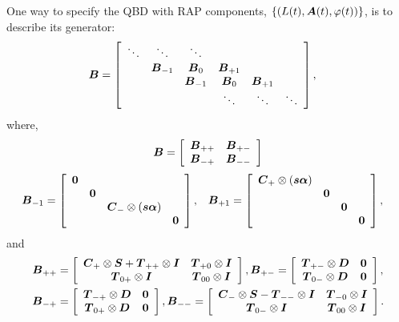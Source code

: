 One way to specify the QBD with RAP components, \(\left\{(L(t),\boldsymbol A(t),{\varphi}(t))\right\}\), is to describe its generator:
\begin{align*}
\boldsymbol{B} &= \left[\begin{array}{cccccc}
 \ddots & \ddots & \ddots & & & \\
 & \boldsymbol{B}_{-1} & \boldsymbol{B}_0 & \boldsymbol{B}_{+1} & & \\ 
 & &  \boldsymbol{B}_{-1} & \boldsymbol{B}_0 & \boldsymbol{B}_{+1} & \\
 & & & \ddots & \ddots & \ddots 
\end{array}\right],
\end{align*}
{where,}
\begin{align*}
	\boldsymbol B &= \left[\begin{array}{ccc} \boldsymbol B_{++} & \boldsymbol B_{+-} \\ \boldsymbol B_{-+} & \boldsymbol B_{--}\end{array}\right]\\
\end{align*}
\begin{align*}
	\boldsymbol{B}_{-1} &= \left[\begin{array}{cccc}
		\boldsymbol 0 & & & \\
		& \boldsymbol 0 & & \\
		& & \boldsymbol{C}_-\otimes (\boldsymbol s\boldsymbol\alpha) & \\ 
		& & & \boldsymbol 0
		\end{array}\right],
	&& \boldsymbol{B}_{+1} = \left[\begin{array}{cccc}
		\boldsymbol{C}_+\otimes (\boldsymbol s\boldsymbol\alpha) & & & \\
		& \boldsymbol 0 & & \\
		& & \boldsymbol 0 & \\ 
		& & & \boldsymbol 0
		\end{array}\right],
\end{align*}
and
\begin{align*}
	\boldsymbol{B}_{++}  &= \left[\begin{array}{cc} \boldsymbol{C}_+\otimes \boldsymbol{S}  + \boldsymbol{T}_{++}\otimes \boldsymbol{I} & \boldsymbol T_{+0}\otimes \boldsymbol I \\ \boldsymbol T_{0+}\otimes \boldsymbol I & \boldsymbol T_{00}\otimes \boldsymbol I\end{array}\right] ,
	\boldsymbol{B}_{+-}  = \left[\begin{array}{cc} \boldsymbol{T}_{+-}\otimes \boldsymbol{D}  & \boldsymbol 0 \\ \boldsymbol T_{0-}\otimes \boldsymbol D  & \boldsymbol 0 \end{array}\right],
	\\ \boldsymbol{B}_{-+}  &=  \left[\begin{array}{cc} \boldsymbol{T}_{-+}\otimes \boldsymbol{D}  & \boldsymbol 0 \\ \boldsymbol T_{0+}\otimes \boldsymbol D  & \boldsymbol 0 \end{array}\right] ,
	\boldsymbol{B}_{--}  = \left[\begin{array}{cc} \boldsymbol{C}_-\otimes \boldsymbol{S}  - \boldsymbol{T}_{--}\otimes \boldsymbol{I} & \boldsymbol T_{-0}\otimes \boldsymbol I \\ \boldsymbol T_{0-}\otimes \boldsymbol I & \boldsymbol T_{00}\otimes \boldsymbol I\end{array}\right].
\end{align*}


